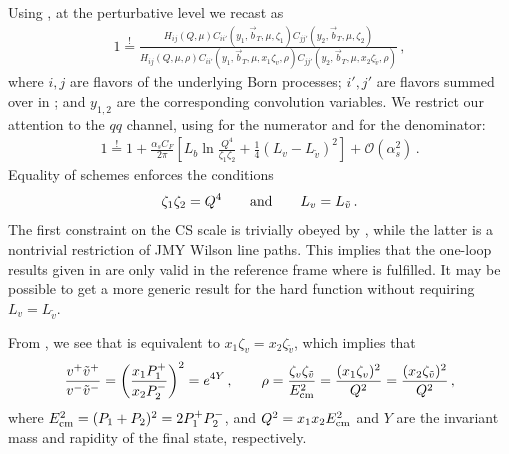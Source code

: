 \documentclass[11pt,a4paper]{article}
\newcommand{\cO}{\mathcal{O}}
\newcommand{\as}{\alpha_s}
\newcommand{\bt}{\vec b_T}
\newcommand{\tv}{{\tilde v}}
\newcommand{\Ecm}{E_{\rm cm}}
\begin{document}
Using ,
at the perturbative level we recast  as
\begin{align} \label{eq:app:fact_thm_cmp_2}
  1 \stackrel{!}{=}
  \frac{H_{ij}(Q, \mu) C_{ii'}(y_1, \bt, \mu, \zeta_1) C_{jj'}(y_2, \bt, \mu, \zeta_2)}
       {H_{ij}(Q, \mu, \rho) C_{ii'} (y_1, \bt, \mu, x_1 \zeta_v, \rho) C_{jj'}(y_2, \bt, \mu, x_2 \zeta_\tv, \rho)}
\,,\end{align}
where $i,j$ are flavors of the underlying Born processes;
$i',j'$ are flavors summed over in ;
and $y_{1,2}$ are the corresponding convolution variables.
We restrict our attention to the $qq$ channel, using  for
the numerator and  for the denominator:
\begin{align}
 1 \stackrel{!}{=} 1 + \frac{\as C_F}{2\pi} \left[ L_b \ln\frac{Q^4}{\zeta_1 \zeta_2} + \frac14 \left(L_v - L_\tv\right)^2 \right] + \cO(\as^2)
\,.\end{align}
Equality of schemes enforces the conditions
\begin{align} \label{eq:app:JMY_condition}
 \zeta_1 \zeta_2 = Q^4
\qquad{\rm and}\qquad
 L_v = L_\tv
\,.\end{align}
The first constraint on the CS scale is trivially obeyed by ,
while the latter is a nontrivial restriction of JMY Wilson line paths.
This implies that the one-loop results given in 
are only valid in the reference frame where  is fulfilled.
It may be possible to get a more generic result for the hard function without requiring $L_v = L_\tv$.

From , we see that  is equivalent to $x_1 \zeta_v = x_2 \zeta_\tv$,
which implies that
\begin{align} \label{eq:app:JMY_condition_2}
 \frac{v^+ \tv^+}{v^- \tv^-}
 = \biggl( \frac{x_1 P_1^+}{x_2 P_2^-}\biggr)^2
 = e^{4 Y}
\,,\qquad
 \rho = \frac{\zeta_v \zeta_\tv}{\Ecm^2} = \frac{(x_1 \zeta_v)^2}{Q^2} = \frac{(x_2 \zeta_\tv)^2}{Q^2}
\,,\end{align}
where $\Ecm^2 = (P_1 + P_2)^2 = 2 P_1^+ P_2^-$,
and $Q^2 = x_1 x_2 \Ecm^2$ and $Y$ are the invariant mass and rapidity of the final state, respectively.
\end{document}
